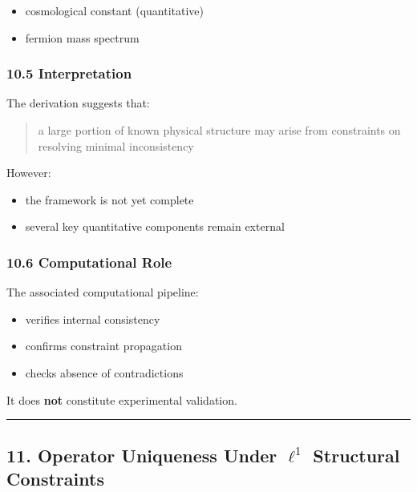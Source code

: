 \documentclass[
]{article}
\providecommand{\tightlist}{%
  \setlength{\itemsep}{0pt}\setlength{\parskip}{0pt}}
\begin{document}
\begin{itemize}
\tightlist
\item
  cosmological constant (quantitative)
\item
  fermion mass spectrum
\end{itemize}

\hypertarget{interpretation-1}{%
\subsubsection{10.5 Interpretation}\label{interpretation-1}}

The derivation suggests that:

\begin{quote}
a large portion of known physical structure may arise from constraints
on resolving minimal inconsistency
\end{quote}

However:

\begin{itemize}
\tightlist
\item
  the framework is not yet complete
\item
  several key quantitative components remain external
\end{itemize}

\hypertarget{computational-role}{%
\subsubsection{10.6 Computational Role}\label{computational-role}}

The associated computational pipeline:

\begin{itemize}
\tightlist
\item
  verifies internal consistency
\item
  confirms constraint propagation
\item
  checks absence of contradictions
\end{itemize}

It does \textbf{not} constitute experimental validation.

\begin{center}\rule{0.5\linewidth}{0.5pt}\end{center}

\hypertarget{operator-uniqueness-under-ell1-structural-constraints}{%
\subsection{\texorpdfstring{11. Operator Uniqueness Under \(\ell^1\)
Structural
Constraints}{11. Operator Uniqueness Under \textbackslash ell\^{}1 Structural Constraints}}\label{operator-uniqueness-under-ell1-structural-constraints}}
\end{document}
